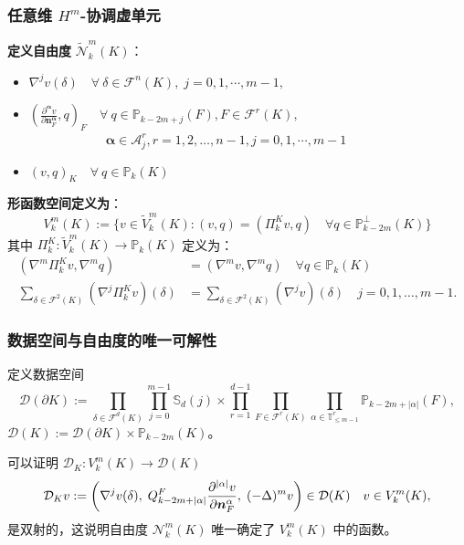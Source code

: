 \documentclass[notheorems,serif]{beamer}
\begin{document}
\begin{frame}
    \frametitle{任意维 $H^m$-协调虚单元}
    \textbf{定义自由度} $\tilde{\mathcal{N}}_k^m(K)$：
  \begin{itemize}
    \item $\nabla^{j}v(\delta) \quad\forall~\delta\in\mathcal F^{n}(K),\;
         j=0,1,\cdots,m-1,$
    \item $(
        \frac{\partial^{\boldsymbol{\alpha}}v}{\partial
    \boldsymbol{n}_F^{\boldsymbol{\alpha}}}, q)_F
        \quad\forall~q\in\mathbb P_{k-2m+j}(F), F\in\mathcal
        F^{r}(K),$\\
        $\quad\quad\quad\quad\quad\quad
        \boldsymbol{\alpha}\in \mathcal{A}_j^r, 
        r = 1, 2, \dots, n-1, j=0,1,\cdots,m-1$
    \item $(v, q)_K \quad\forall~q\in\mathbb P_{k}(K)$ 
  \end{itemize}
  \textbf{形函数空间定义为}：
    $$
    V_k^m(K) := \{v \in \widetilde{V}_k^m(K): (v, q) = (\Pi_k^Kv, q) \quad 
        \forall q \in \mathbb{P}_{k-2m}^{\perp}(K)\}
    $$
其中 $\Pi_k^K : \widetilde{V}_k^m(K) \to \mathbb{P}_k(K)$ 定义为：
$$
\begin{aligned}
    (\nabla^m \Pi_k^K v, \nabla^m q) &  = (\nabla^m v, \nabla^m q) \quad
    \forall q \in \mathbb{P}_k(K)\\
    \sum_{\delta\in\mathcal{F}^2(K)}(\nabla^j\Pi_k^K v)(\delta) & = 
    \sum_{\delta\in\mathcal{F}^2(K)}(\nabla^j v)(\delta) \quad j = 0, 1,
    \dots, m-1.
\end{aligned} 
$$
\end{frame}

\begin{frame}
  \frametitle{数据空间与自由度的唯一可解性}
\small
\begin{definition}[数据空间]
定义数据空间
$$
\mathcal D(\partial K):=\prod_{\delta\in\mathcal F^d(K)}\prod_{j=0}^{m-1}\mathbb
S_d(j) \times \prod_{r=1}^{d-1}\prod_{F\in\mathcal F^r(K)}\prod_{\alpha\in
\mathbb{T}^r_{\leq m-1}}\mathbb P_{k-2m+|\alpha|}(F),
$$
$\mathcal D(K):=\mathcal D(\partial K)\times\mathbb P_{k-2m}(K)$。
\end{definition}
可以证明 $\mathcal D_K: V_k^m(K)\to\mathcal D(K)$
$$
\mathcal D_Kv:=\left(\nabla^{j}v(\delta),\;
Q_{k-2m+|\alpha|}^F\frac{\partial^{|\alpha|}v}{\partial \boldsymbol{n}_F^{\alpha}},\;
(-\Delta)^mv\right) \in \mathcal D(K) \quad v\in V_k^m(K),
$$
是双射的，这说明自由度 $\mathcal N_k^m(K)$ 唯一确定了 $V_k^m(K)$ 中的函数。

\end{frame}
\end{document}
